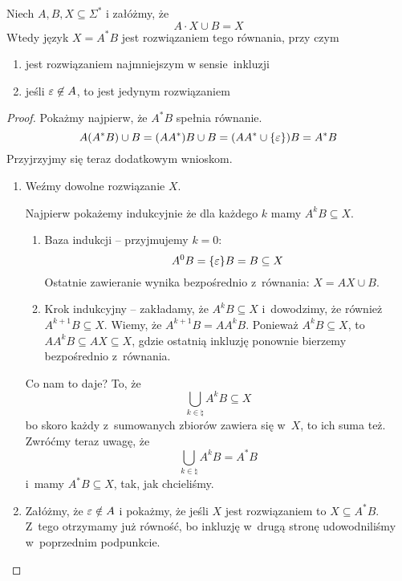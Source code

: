 \begin{lemma}
	Niech \(A, B, X \subseteq \Sigma^*\) i załóżmy, że
	\begin{equation*}
		A\cdot X \cup B = X
	\end{equation*}
	Wtedy język \(X = A^*B\) jest rozwiązaniem tego równania, przy czym
	\begin{enumerate}[label={(\roman*)}]
		\item jest rozwiązaniem najmniejszym w sensie~inkluzji
		\item jeśli \(\varepsilon \not\in A\), to jest jedynym rozwiązaniem
	\end{enumerate}
\end{lemma}
\begin{proof}
	Pokażmy najpierw, że \(A^*B\) spełnia równanie.
	\begin{equation*}
		A\pars{A^*B} \cup B
		= \pars{AA^*}B \cup B
		= \pars{AA^*\cup \set{\eps}}B
		= A^*B
	\end{equation*}
	Przyjrzyjmy się teraz dodatkowym wnioskom.
	\begin{enumerate}[label={(\roman*)}]
		\item Weźmy dowolne rozwiązanie \(X\).

		      Najpierw pokażemy indukcyjnie że dla każdego \( k \) mamy \( A^kB \subseteq X \).
		      \begin{enumerate}[label={{\arabic*}.}]
			      \item Baza indukcji -- przyjmujemy \(k = 0\):
			            \begin{equation*}
				            A^0B = \set{\eps}B = B \subseteq X
			            \end{equation*}
			            Ostatnie zawieranie wynika bezpośrednio z~równania: \(X = AX \cup B\).
			      \item Krok indukcyjny -- zakładamy, że \(A^kB \subseteq X\) i~dowodzimy, że również \(A^{k + 1}B \subseteq X\). Wiemy, że \(A^{k + 1}B = AA^kB\). Ponieważ \(A^kB \subseteq X\), to \(AA^kB \subseteq AX \subseteq X\), gdzie ostatnią inkluzję ponownie bierzemy bezpośrednio z~równania.
		      \end{enumerate}
		      Co nam to daje? To, że
		      \begin{equation*}
			      \bigcup_{k \in \natural} A^kB \subseteq X
		      \end{equation*}
		      bo skoro każdy z~sumowanych zbiorów zawiera się w~\(X\), to ich suma też. Zwróćmy teraz uwagę, że
		      \begin{equation*}
			      \bigcup_{k \in \natural} A^kB = A^*B
		      \end{equation*}
		      i~mamy \(A^*B \subseteq X\), tak, jak chcieliśmy.
		\item Załóżmy, że \( \varepsilon \notin A\) i pokażmy, że jeśli \(X\) jest rozwiązaniem to \(X \subseteq A^*B\). Z~tego otrzymamy już równość, bo inkluzję w~drugą stronę udowodniliśmy w~poprzednim podpunkcie.


\end{enumerate}
\end{proof}
